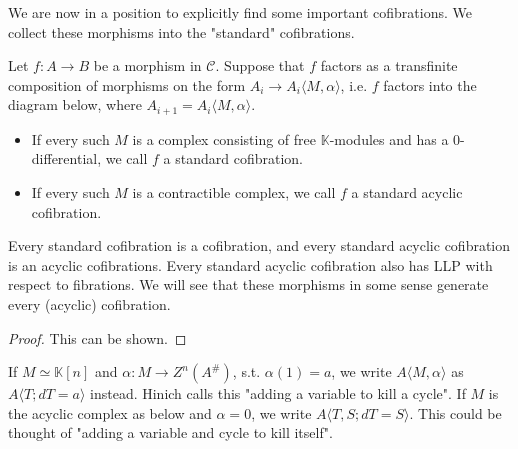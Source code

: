 \documentclass[../thesis.tex]{subfiles}
\begin{document}
            We are now in a position to explicitly find some important cofibrations. We collect these morphisms into the "standard" cofibrations.

            \begin{definition}
                Let $f:A\rightarrow B$ be a morphism in $\mathcal{C}$. Suppose that $f$ factors as a transfinite composition of morphisms on the form $A_i \rightarrow A_i\langle M,\alpha\rangle$, i.e. $f$ factors into the diagram below, where $A_{i+1} = A_i\langle M,\alpha\rangle$.
                \begin{center}
                \end{center}
                \begin{itemize}
                    \item If every such $M$ is a complex consisting of free $\mathbb{K}$-modules and has a $0$-differential, we call $f$ a standard cofibration.
                    \item If every such $M$ is a contractible complex, we call $f$ a standard acyclic cofibration.
                \end{itemize}
            \end{definition}

            \begin{proposition}
                Every standard cofibration is a cofibration, and every standard acyclic cofibration is an acyclic cofibrations. Every standard acyclic cofibration also has LLP with respect to fibrations. We will see that these morphisms in some sense generate every (acyclic) cofibration.
            \end{proposition}

            \begin{proof}
                This can be shown.
            \end{proof}

            If $M\simeq \mathbb{K}[n]$ and $\alpha: M \rightarrow Z^n(A^\#)$, s.t. $\alpha(1) = a$, we write $A\langle M,\alpha\rangle$ as $A\langle T; dT = a\rangle$ instead. Hinich calls this "adding a variable to kill a cycle". If $M$ is the acyclic complex as below and $\alpha = 0$, we write $A\langle T, S; dT = S\rangle$. This could be thought of "adding a variable and cycle to kill itself".
\end{document}
